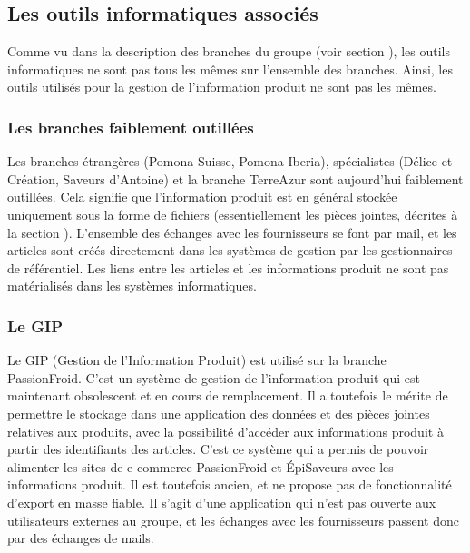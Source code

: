         \subsection{Les outils informatiques associés}
        \label{outils_infos}

        Comme vu dans la description des branches du groupe (voir section ), les outils informatiques ne sont pas tous les mêmes sur l'ensemble des branches.
        Ainsi, les outils utilisés pour la gestion de l'information produit ne sont pas les mêmes.

            \subsubsection{Les branches faiblement outillées}
            
            Les branches étrangères (Pomona Suisse, Pomona Iberia), spécialistes (Délice et Création, Saveurs d'Antoine) et la branche TerreAzur sont aujourd'hui faiblement outillées.
            Cela signifie que l'information produit est en général stockée uniquement sous la forme de fichiers (essentiellement les pièces jointes, décrites à la section ).
            L'ensemble des échanges avec les fournisseurs se font par mail, et les articles sont créés directement dans les systèmes de gestion par les gestionnaires de référentiel.
            Les liens entre les articles et les informations produit ne sont pas matérialisés dans les systèmes informatiques.

            \subsubsection{Le GIP}
            \label{GIP}

            Le GIP (Gestion de l'Information Produit) est utilisé sur la branche PassionFroid.
            C'est un système de gestion de l'information produit qui est maintenant obsolescent et en cours de remplacement.
            Il a toutefois le mérite de permettre le stockage dans une application des données et des pièces jointes relatives aux produits, avec la possibilité d'accéder aux informations produit à partir des identifiants des articles.
            C'est ce système qui a permis de pouvoir alimenter les sites de e-commerce PassionFroid et \'{E}piSaveurs avec les informations produit.
            Il est toutefois ancien, et ne propose pas de fonctionnalité d'export en masse fiable.
            Il s'agit d'une application qui n'est pas ouverte aux utilisateurs externes au groupe, et les échanges avec les fournisseurs passent donc par des échanges de mails.

